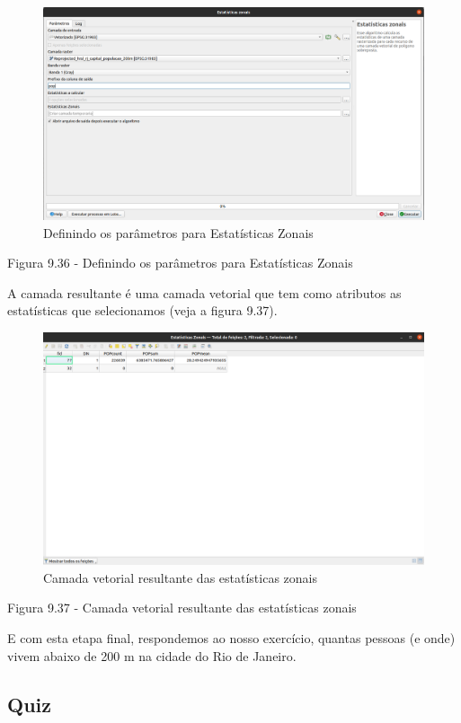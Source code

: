 \documentclass[
]{krantz}
\begin{document}
\begin{figure}
\centering
\includegraphics{media/modulo9/fig936.png}
\caption{Definindo os parâmetros para Estatísticas Zonais}
\end{figure}

Figura 9.36 - Definindo os parâmetros para Estatísticas Zonais

A camada resultante é uma camada vetorial que tem como atributos as estatísticas que selecionamos (veja a figura 9.37).

\begin{figure}
\centering
\includegraphics{media/modulo9/fig937.png}
\caption{Camada vetorial resultante das estatísticas zonais}
\end{figure}

Figura 9.37 - Camada vetorial resultante das estatísticas zonais

E com esta etapa final, respondemos ao nosso exercício, quantas pessoas (e onde) vivem abaixo de 200 m na cidade do Rio de Janeiro.

\hypertarget{quiz-22}{%
\subsection{Quiz}\label{quiz-22}}
\end{document}
